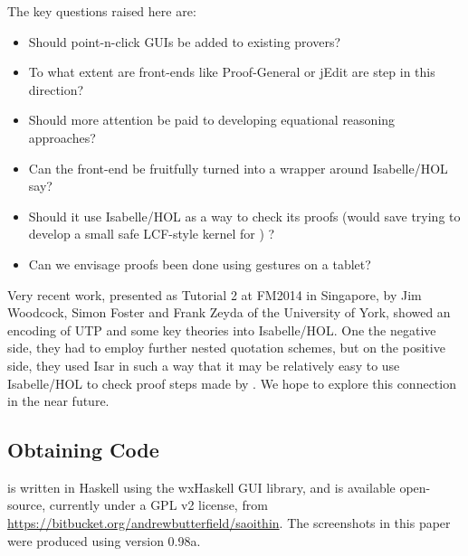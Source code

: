 The key questions raised here are:
\begin{itemize}
  \item Should point-n-click GUIs be added to existing provers?
  \item To what extent are front-ends like Proof-General or jEdit
  are step in this direction?
  \item
    Should more attention be paid to developing equational reasoning approaches?
  \item
  Can the  front-end be fruitfully turned into a wrapper around Isabelle/HOL say?
  \item
  Should it use Isabelle/HOL as a way to check its proofs
  (would save trying to develop a small safe LCF-style kernel for ) ?
  \item
   Can we envisage proofs been done using gestures on a tablet?
\end{itemize}
Very recent work, presented as Tutorial 2 at FM2014 in Singapore, by Jim Woodcock, Simon Foster
and Frank Zeyda of the University of York, showed an encoding of UTP and some key theories
into Isabelle/HOL. One the negative side, they had to employ further nested quotation schemes,
but on the positive side, they used Isar in such a way that it may be relatively easy to use
Isabelle/HOL to check proof steps made by . We hope to explore this connection in the near future.

\subsection{Obtaining Code}

 is written in Haskell using the wxHaskell GUI library,
and is available open-source, currently under a GPL v2 license,
from \url{https://bitbucket.org/andrewbutterfield/saoithin}.
The screenshots in this paper were produced using version 0.98a.
